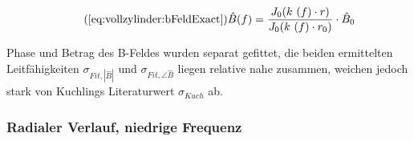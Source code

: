 {\begin{minipage}[t]{0.33\textwidth}
\begin{minipage}[t]{0.5\textwidth}
            \begin{equation}
                \tag{\ref{eq:vollzylinder:bFeldExact}}
                \hat{B} (f) = \frac{J_0 (k~(f) \cdot r)}{J_0 (k~(f) \cdot r_0)} \cdot \hat{B}_0
            \end{equation}

            Phase  und  Betrag  des  B-Feldes  wurden  separat  gefittet,  die
            beiden  ermittelten   Leitf\"ahigkeiten  $\sigma_{Fit,|\hat{B}|}$
            und  $\sigma_{Fit,\angle\hat{B}}$ liegen  relative nahe  zusammen,
            weichen jedoch  stark von Kuchlings  Literaturwert $\sigma_{Kuch}$
            ab.

        \end{minipage}

        \vspace{1em}

        \begin{minipage}[c][][b]{0.5\textwidth}
            \vspace{0pt}
            
        \end{minipage}%
        \begin{minipage}[c][][b]{0.5\textwidth}
            \hfill
            \resizebox{\textwidth}{!}{}
            \label{fig:alu:freq:sensor}
        \end{minipage}
	\end{minipage}%
	\begin{minipage}[t]{0.67\textwidth}
        \vspace{0pt}\raggedright
        \hfill
        \resizebox{.95\textwidth}{!}{}
        \label{fig:alu:freq:exact}
	\end{minipage}


    \subsubsection{Radialer Verlauf, niedrige Frequenz}
    \label{sec:ausw:subsec:hohlz:subsubsec:steel}

}
